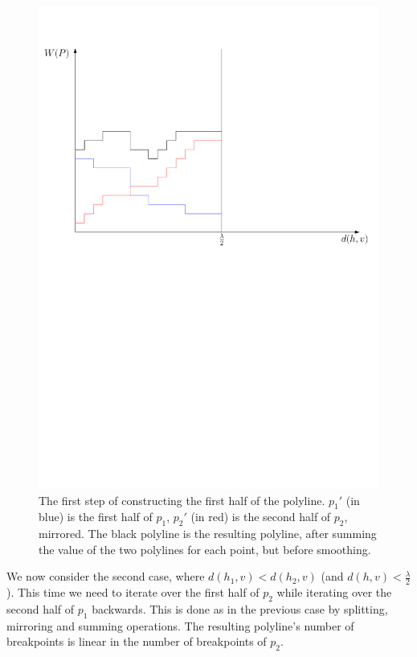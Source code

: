 \documentclass[11pt,a4paper]{article}
\theoremstyle{definition}
\theoremstyle{remark}
\begin{document}
\begin{enumerate}
\begin{figure}[h]
\begin{center}
\includegraphics[scale=0.4]{polyline_first_half_construction_case1}
\end{center}
\caption{The first step of constructing the first half of the polyline. $p_1'$ (in blue) is the first half of $p_1$, $p_2'$ (in red) is the second half of $p_2$, mirrored. The black polyline is the resulting polyline, after summing the value of the two polylines for each point, but before smoothing.
\label{figure of constructing the second half of the polyline}}
\end{figure}


We now consider the second case, where $d(h_1,v) < d(h_2,v)$ (and $d(h,v) < \frac{\lambda}{2}$). This time we need to iterate over the first half of $p_2$ while iterating over the second half of $p_1$ backwards. This is done as in the previous case by splitting, mirroring and summing operations. The resulting polyline's number of breakpoints is linear in the number of breakpoints of $p_2$.





\end{enumerate}
\end{document}
